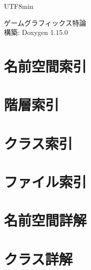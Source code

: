 \documentclass[twoside]{book}
\newcommand{\+}{\discretionary{\mbox{\scriptsize$\hookleftarrow$}}{}{}}
\newcommand{\clearemptydoublepage}{%
    \newpage{\pagestyle{empty}\cleardoublepage}%
  }
\begin{document}
  \raggedbottom
  \begin{CJK}{UTF8}{min}
    \hypersetup{pageanchor=false,
                bookmarksnumbered=true,
                pdfencoding=unicode
               }
  \begin{titlepage}
  \vspace*{7cm}
  \begin{center}%
  {\Large ゲームグラフィックス特論}\\
  \vspace*{1cm}
  {\large 構築\+: Doxygen 1.15.0}\\
  \end{center}
  \end{titlepage}
  \clearemptydoublepage
  \tableofcontents
  \clearemptydoublepage
  \hypersetup{pageanchor=true}



\chapter{名前空間索引}

\chapter{階層索引}

\chapter{クラス索引}

\chapter{ファイル索引}

\chapter{名前空間詳解}

\chapter{クラス詳解}




























\end{CJK}
\end{document}
